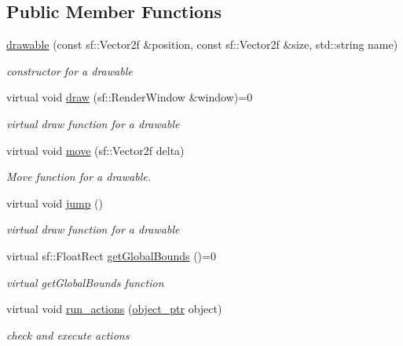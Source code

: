 \subsection*{Public Member Functions}
\begin{DoxyCompactItemize}
\item 
\hyperlink{classdrawable_a4e7881285581530d21b5c9fd59879b30}{drawable} (const sf\+::\+Vector2f \&position, const sf\+::\+Vector2f \&size, std\+::string name)
\begin{DoxyCompactList}\small\item\em constructor for a drawable \end{DoxyCompactList}\item 
virtual void \hyperlink{classdrawable_a4e49e2c1121704c83ce24c5f48dd910f}{draw} (sf\+::\+Render\+Window \&window)=0
\begin{DoxyCompactList}\small\item\em virtual draw function for a drawable \end{DoxyCompactList}\item 
virtual void \hyperlink{classdrawable_ad0d3930c045cc6776aa2c3965be32491}{move} (sf\+::\+Vector2f delta)
\begin{DoxyCompactList}\small\item\em Move function for a drawable. \end{DoxyCompactList}\item 
virtual void \hyperlink{classdrawable_ac39691470b7874f5dec59efe649d3981}{jump} ()
\begin{DoxyCompactList}\small\item\em virtual draw function for a drawable \end{DoxyCompactList}\item 
virtual sf\+::\+Float\+Rect \hyperlink{classdrawable_ae013ac0be47538be9ce885d6642daf73}{get\+Global\+Bounds} ()=0
\begin{DoxyCompactList}\small\item\em virtual get\+Global\+Bounds function \end{DoxyCompactList}\item 
virtual void \hyperlink{classdrawable_a715df01a318331e5611a2b0ad30109ff}{run\+\_\+actions} (\hyperlink{drawable_8hpp_aab5add95f06d2ba25dbfed8eb07274fa}{object\+\_\+ptr} object)
\begin{DoxyCompactList}\small\item\em check and execute actions \end{DoxyCompactList}\item 

\end{DoxyCompactItemize}
